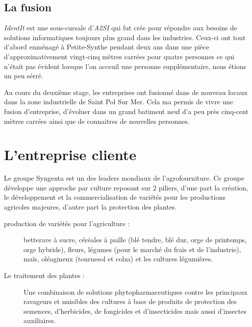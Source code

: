 
\subsection{La fusion} %
\label{sub:La fusion}

\emph{IdentIt} est une sous-cursale d'\emph{A2SI} qui fut crée pour
répondre aux besoins de solutions informatiques toujours plus grand dans
les industries. Ceux-ci ont tout d'abord enménagé à Petite-Synthe
pendant deux ans dans une pièce d'approximativement vingt-cinq mètres carrées
pour quatre personnes ce qui n'était pas évident lorsque l'on acceuil
une personne supplémentaire, nous étions un peu sérré.

Au cours du deuxième stage, les entreprises ont \og fusionné \fg{} dans
de nouveau locaux dans la zone industrielle de Saint Pol Sur Mer. Cela
ma permis de vivre une fusion d'entreprise, d'évoluer dans un grand
batiment neuf d'a peu près cinq-cent mètres carrées ainsi que de
connaitres de nouvelles personnes.



\section{L'entreprise cliente} %
\label{sec:L'entreprise cliente}

Le groupe Syngenta est un des leaders mondiaux de l’agrofourniture.
Ce groupe développe une approche par culture reposant sur 2 piliers,
d'une part la création, le développement et la commercialisation de
variétés pour les productions agricoles majeures, d'autre part la
protection des plantes.

\begin{description}

  \item[production de variétés pour l'agriculture :] betterave à sucre,
    céréales à paille (blé tendre, blé dur, orge de printemps, orge
    hybride), fleurs, légumes (pour le marché du frais et de
    l’industrie), maïs, oléagineux (tournesol et colza) et les cultures
    légumières.

  \item[Le traitement des plantes :] Une combinaison de solutions
    phytopharmaceutiques contre les principaux ravageurs et nuisibles
    des cultures à base de produits de protection des semences,
    d’herbicides, de fongicides et d’insecticides mais aussi d’insectes
    auxiliaires.

\end{description}


